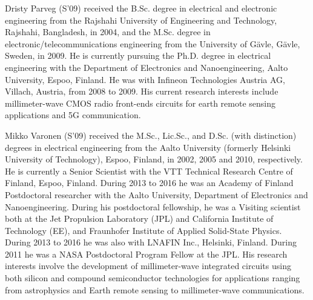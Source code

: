 \documentclass[journal]{IEEEtran}
\begin{document}
% 

\begin{IEEEbiography}{Dristy Parveg}
(S'09) received the B.Sc. degree in electrical and electronic engineering from the Rajshahi University of Engineering and Technology, Rajshahi, Bangladesh, in 2004, and the M.Sc. degree in electronic/telecommunications engineering from the University of Gävle, Gävle, Sweden, in 2009. He is currently pursuing the Ph.D. degree in electrical engineering with the Department of Electronics and Nanoengineering, Aalto University, Espoo, Finland. He was with Infineon Technologies Austria AG, Villach, Austria, from 2008 to 2009. His current research interests include millimeter-wave CMOS radio front-ends circuits for earth remote sensing applications and 5G communication.
\end{IEEEbiography}

\begin{IEEEbiographynophoto}{Mikko Varonen}
(S'09) received the M.Sc., Lic.Sc., and D.Sc. (with distinction) degrees in electrical
engineering from the Aalto University (formerly Helsinki University of Technology), Espoo, Finland, in 2002, 2005 and 2010, respectively.
He is currently a Senior Scientist with
the VTT Technical Research Centre of
Finland, Espoo, Finland. During 2013 to
2016 he was an Academy of Finland
Postdoctoral researcher with the Aalto
University, Department of Electronics and Nanoengineering. During his postdoctoral fellowship, he was a Visiting scientist
both at the Jet Propulsion Laboratory (JPL) and California Institute of
Technology (EE), and Fraunhofer Institute of Applied Solid-State Physics.
During 2013 to 2016 he was also with LNAFIN Inc., Helsinki, Finland.
During 2011 he was a NASA Postdoctoral Program Fellow at the JPL. His
research interests involve the development of millimeter-wave integrated
circuits using both silicon and compound semiconductor technologies for
applications ranging from astrophysics and Earth remote sensing to
millimeter-wave communications.

\end{IEEEbiographynophoto}
\end{document}
